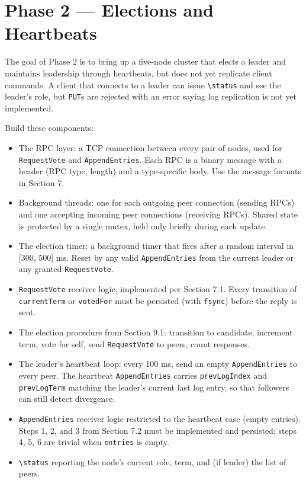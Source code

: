 \documentclass[11pt,a4paper]{article}
\begin{document}
\section{Phase 2 --- Elections and Heartbeats}

The goal of Phase 2 is to bring up a five-node cluster that elects a leader and maintains leadership through heartbeats, but does not yet replicate client commands. A client that connects to a leader can issue \verb|\status| and see the leader's role, but \texttt{PUT}s are rejected with an error saying log replication is not yet implemented.

Build these components:

\begin{itemize}
\item The RPC layer: a TCP connection between every pair of nodes, used for \texttt{RequestVote} and \texttt{AppendEntries}. Each RPC is a binary message with a header (RPC type, length) and a type-specific body. Use the message formats in Section 7.

\item Background threads: one for each outgoing peer connection (sending RPCs) and one accepting incoming peer connections (receiving RPCs). Shared state is protected by a single mutex, held only briefly during each update.

\item The election timer: a background timer that fires after a random interval in [300, 500] ms. Reset by any valid \texttt{AppendEntries} from the current leader or any granted \texttt{RequestVote}.

\item \texttt{RequestVote} receiver logic, implemented per Section 7.1. Every transition of \texttt{currentTerm} or \texttt{votedFor} must be persisted (with \texttt{fsync}) before the reply is sent.

\item The election procedure from Section 9.1: transition to candidate, increment term, vote for self, send \texttt{RequestVote} to peers, count responses.

\item The leader's heartbeat loop: every 100 ms, send an empty \texttt{AppendEntries} to every peer. The heartbeat \texttt{AppendEntries} carries \texttt{prevLogIndex} and \texttt{prevLogTerm} matching the leader's current last log entry, so that followers can still detect divergence.

\item \texttt{AppendEntries} receiver logic restricted to the heartbeat case (empty entries). Steps 1, 2, and 3 from Section 7.2 must be implemented and persisted; steps 4, 5, 6 are trivial when \texttt{entries} is empty.

\item \verb|\status| reporting the node's current role, term, and (if leader) the list of peers.
\end{itemize}
\end{document}
